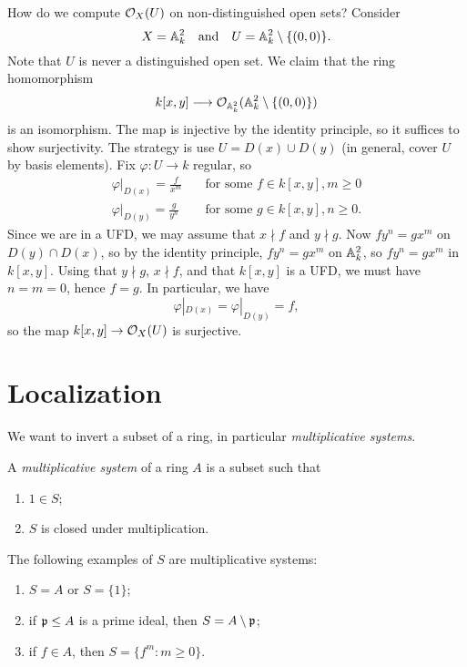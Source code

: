 \begin{example}
  How do we compute $\mathcal{O}_X(U)$ on
  non-distinguished open sets? Consider
  \[
    X = \mathbb{A}_k^2 \quad \text{and} \quad
    U = \mathbb{A}_k^2 \setminus \{(0,0)\}.
  \]
  Note that $U$ is never a distinguished
  open set. We claim that the ring
  homomorphism
  \[
    k[x, y] \longrightarrow \mathcal{O}_{\mathbb{A}_k^2}(\mathbb{A}_k^2 \setminus \{(0,0)\})
  \]
  is an isomorphism. The map is
  injective by the identity principle,
  so it suffices to show surjectivity.
  The strategy is use
  $U = D(x) \cup D(y)$ (in general, cover
  $U$ by basis elements). Fix
  $\varphi : U \to k$ regular, so
  \begin{align*}
    \varphi|_{D(x)}
    = \frac{f}{x^m} \quad &\text{for some } f \in k[x, y], m \ge 0 \\
    \varphi|_{D(y)}
    = \frac{g}{y^n} \quad & \text{for some } g \in k[x, y], n \ge 0.
  \end{align*}
  Since we are in a UFD, we may assume
  that
  $x \nmid f$ and $y \nmid g$.
  Now $fy^n = gx^m$ on $D(y) \cap D(x)$,
  so by the identity principle,
  $fy^n = gx^m$ on $\mathbb{A}_k^2$, so
  $fy^n = gx^m$ in $k[x, y]$.
  Using that $y \nmid g$, $x \nmid f$,
  and that $k[x, y]$ is a UFD, we must
  have $n = m = 0$, hence $f = g$. In
  particular, we have
  \[
    \varphi|_{D(x)} = \varphi|_{D(y)} = f,
  \]
  so the map $k[x, y] \to \mathcal{O}_{X}(U)$
  is surjective.
\end{example}

\section{Localization}

\begin{remark}
  We want to invert a subset of a ring,
  in particular \emph{multiplicative systems}.
\end{remark}

\begin{definition}
  A \emph{multiplicative system}
  of a ring $A$ is a subset such that
  \begin{enumerate}
    \item $1 \in S$;
    \item $S$ is closed under
      multiplication.
  \end{enumerate}
\end{definition}

\begin{example}
  The following examples of $S$ are
  multiplicative systems:
  \begin{enumerate}
    \item $S = A$ or $S = \{1\}$;
    \item if $\mathfrak{p} \le A$ is a prime ideal,
      then $S = A \setminus \mathfrak{p}$;
    \item if $f \in A$, then
      $S = \{f^m : m \ge 0\}$.
  \end{enumerate}
\end{example}


